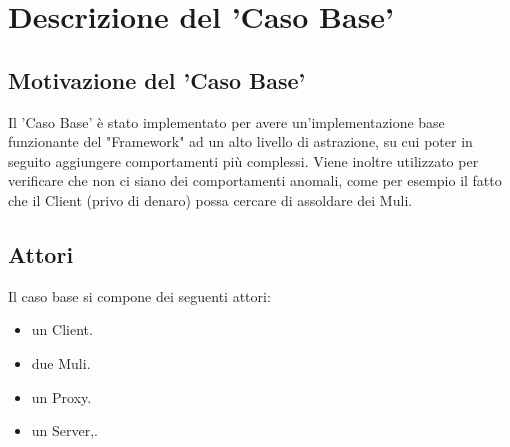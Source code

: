 \documentclass[13pt,a4paper]{article}
\begin{document}
	
	\section{Descrizione del 'Caso Base'}
	\subsection{Motivazione del 'Caso Base'} 
	Il 'Caso Base' è stato implementato per avere un'implementazione base funzionante del "Framework" ad un alto livello di astrazione, su cui poter in seguito aggiungere comportamenti più complessi. Viene inoltre utilizzato per verificare che non ci siano dei comportamenti anomali, come per esempio il fatto che il Client (privo di denaro) possa cercare di assoldare dei Muli.
	\subsection{Attori}
	Il caso base si compone dei seguenti attori: 
	\begin{itemize}
		\item un Client.
		\item due Muli.
		\item un Proxy.
		\item un Server,.
	\end{itemize}
	
\end{document}
